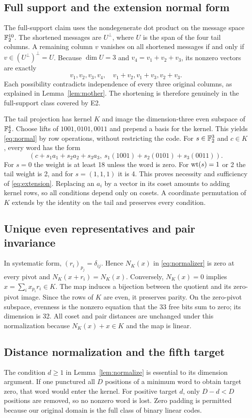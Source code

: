 \subsection{Full support and the extension normal form}
The full-support claim uses the nondegenerate dot product on the message space $\mathbb F_2^{10}$. The shortened messages are $U^\perp$, where $U$ is the span of the four tail columns. A remaining column $v$ vanishes on all shortened messages if and only if $v\in(U^\perp)^\perp=U$. Because $\dim U=3$ and $v_4=v_1+v_2+v_3$, its nonzero vectors are exactly
\[
 v_1,v_2,v_3,v_4,\quad v_1+v_2,v_1+v_3,v_2+v_3.
\]
Each possibility contradicts independence of every three original columns, as explained in Lemma~\ref{lem:mother}. The shortening is therefore genuinely in the full-support class covered by E2.

The tail projection has kernel $K$ and image the dimension-three even subspace of $\mathbb F_2^4$. Choose lifts of $1001,0101,0011$ and prepend a basis for the kernel. This yields \eqref{eq:normal} by row operations, without restricting the code. For $s\in\mathbb F_2^3$ and $c\in K$, every word has the form
\[
 \left(c+s_1a_1+s_2a_2+s_3a_3,\ s_1(1001)+s_2(0101)+s_3(0011)\right).
\]
For $s=0$ the weight is at least 18 unless the word is zero. For $\operatorname{wt}(s)=1$ or 2 the tail weight is 2, and for $s=(1,1,1)$ it is 4. This proves necessity and sufficiency of \eqref{eq:extension}. Replacing an $a_i$ by a vector in its coset amounts to adding kernel rows, so all conditions depend only on cosets. A coordinate permutation of $K$ extends by the identity on the tail and preserves every condition.

\subsection{Unique even representatives and pair invariance}
In systematic form, $(r_i)_{p_j}=\delta_{ij}$. Hence $N_K(x)$ in \eqref{eq:normalizer} is zero at every pivot and $N_K(x+r_i)=N_K(x)$. Conversely, $N_K(x)=0$ implies $x=\sum_i x_{p_i}r_i\in K$. The map induces a bijection between the quotient and its zero-pivot image. Since the rows of $K$ are even, it preserves parity. On the zero-pivot subspace, evenness is the nonzero equation that the 33 free bits sum to zero; its dimension is 32. All coset and pair distances are unchanged under this normalization because $N_K(x)+x\in K$ and the map is linear.

\subsection{Distance normalization and the fifth target}
The condition $d\ge1$ in Lemma~\ref{lem:normalize} is essential to its dimension argument. If one punctured all $D$ positions of a minimum word to obtain target zero, that word would enter the kernel. For positive target $d$, only $D-d<D$ positions are removed, so no nonzero word is lost. Zero padding is permitted because our original domain is the full class of binary linear codes.

